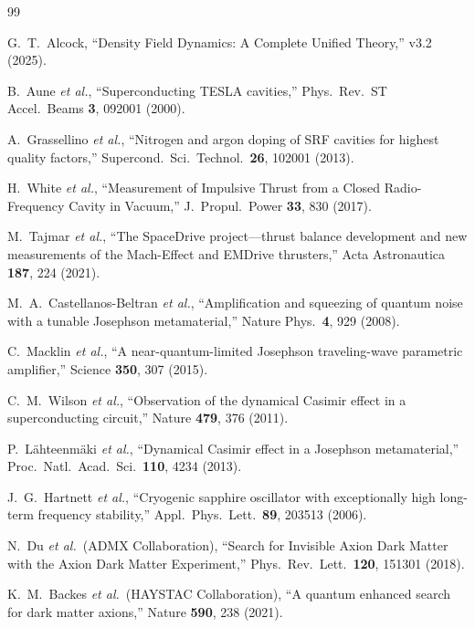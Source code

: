 \documentclass[12pt,aps,prd,twocolumn,superscriptaddress,nofootinbib]{revtex4-2}
\begin{document}
\begin{thebibliography}{99}

G.~T.~Alcock, ``Density Field Dynamics: A Complete Unified Theory,''
v3.2 (2025).

B.~Aune \textit{et al.}, ``Superconducting TESLA cavities,''
Phys.\ Rev.\ ST Accel.\ Beams \textbf{3}, 092001 (2000).

A.~Grassellino \textit{et al.}, ``Nitrogen and argon doping of SRF
cavities for highest quality factors,''
Supercond.\ Sci.\ Technol.\ \textbf{26}, 102001 (2013).

H.~White \textit{et al.}, ``Measurement of Impulsive Thrust from a
Closed Radio-Frequency Cavity in Vacuum,''
J.\ Propul.\ Power \textbf{33}, 830 (2017).

M.~Tajmar \textit{et al.}, ``The SpaceDrive project---thrust balance
development and new measurements of the Mach-Effect and EMDrive
thrusters,'' Acta Astronautica \textbf{187}, 224 (2021).

M.~A.~Castellanos-Beltran \textit{et al.}, ``Amplification and squeezing
of quantum noise with a tunable Josephson metamaterial,''
Nature Phys.\ \textbf{4}, 929 (2008).

C.~Macklin \textit{et al.}, ``A near-quantum-limited Josephson
traveling-wave parametric amplifier,'' Science \textbf{350}, 307 (2015).

C.~M.~Wilson \textit{et al.}, ``Observation of the dynamical Casimir
effect in a superconducting circuit,'' Nature \textbf{479}, 376 (2011).

P.~L\"ahteenm\"aki \textit{et al.}, ``Dynamical Casimir effect in a
Josephson metamaterial,'' Proc.\ Natl.\ Acad.\ Sci.\ \textbf{110},
4234 (2013).

J.~G.~Hartnett \textit{et al.}, ``Cryogenic sapphire oscillator with
exceptionally high long-term frequency stability,''
Appl.\ Phys.\ Lett.\ \textbf{89}, 203513 (2006).

N.~Du \textit{et al.}\ (ADMX Collaboration), ``Search for Invisible
Axion Dark Matter with the Axion Dark Matter Experiment,''
Phys.\ Rev.\ Lett.\ \textbf{120}, 151301 (2018).

K.~M.~Backes \textit{et al.}\ (HAYSTAC Collaboration), ``A quantum
enhanced search for dark matter axions,'' Nature \textbf{590}, 238 (2021).


\end{thebibliography}
\end{document}
